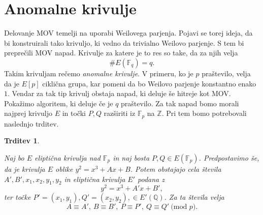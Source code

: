 \documentclass[12pt,a4paper,twoside]{article}
\theoremstyle{definition} %
\theoremstyle{plain} %
\newtheorem{trditev}[definicija]{Trditev}
\numberwithin{equation}{section}  %
\newcommand{\Z}{\mathbb Z}
\newcommand{\Q}{\mathbb Q}
\newcommand{\F}{\mathbb F}
\newcommand{\E}[1]{E({#1})}
\newcommand{\MOD}[1]{\ \text{(mod }{#1}\text{)}}
\begin{document}
\section{Anomalne krivulje}

Delovanje MOV temelji na uporabi Weilovega parjenja. Pojavi se torej ideja, da bi konstruirali tako krivuljo, ki vedno da trivialno Weilovo parjenje. S tem bi preprečili MOV napad. Krivulje za katere je to res so take, da za njih velja
$$\#\E{\F_q} = q.$$
Takim krivuljam rečemo \emph{anomalne krivulje}. V primeru, ko je $p$ praštevilo, velja da je $E[p]$ ciklična grupa, kar pomeni da bo Weilovo parjenje konstantno enako $1$. Vendar za tak tip krivulj obstaja napad, ki deluje še hitreje kot MOV.
Pokažimo algoritem, ki deluje če je $q$ praštevilo.
Za tak napad bomo morali najprej krivuljo $E$ in točki $P,Q$ razširiti iz $\F_p$ na $\Z$. Pri tem bomo potrebovali naslednjo trditev.

\begin{trditev}~

\label{trd:5.6}
Naj bo $E$ eliptična krivulja nad $\F_p$ in naj bosta $P,Q \in \E{\F_p}$. Predpostavimo še, da je krivulja $E$ oblike $y^2=x^3+Ax+B$. Potem obstajajo cela števila
$A',B',x_1,x_2,y_1,y_2$ in eliptična krivulja $E'$ podana z
$$y^2=x^3+A'x+B',$$
ter točke $P'=(x_1,y_1),Q'=(x_2,y_2), \in E'(\Q)$.
Za ta števila velja
$$A\equiv A',\ B \equiv B',\ P \equiv P',\ Q \equiv Q' \MOD{p}.$$

\end{trditev}
\end{document}
